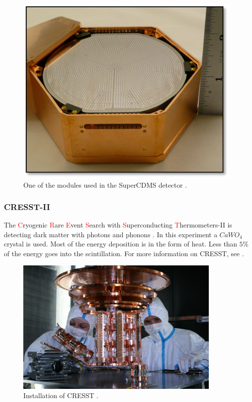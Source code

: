 \documentclass{article}
\begin{document}
\begin{figure}
    \centering
    \includegraphics[width=.9\textwidth]{SuperCDMS.png}
    \caption{One of the modules used in the SuperCDMS detector \cite{SuperCDMSphoto}.}
    \label{fig:SuperCDMS}
\end{figure}

\subsubsection{CRESST-II}
\label{sec:CRESST} The \textcolor{red}{C}ryogenic \textcolor{red}{R}are \textcolor{red}{E}vent \textcolor{red}{S}earch with \textcolor{red}{S}uperconducting \textcolor{red}{T}hermometers-II is detecting dark matter with photons and phonons \cite{Angloher:2015ewa}. In this experiment a $CaWO_4$ crystal is used. Most of the energy deposition is in the form of heat. Less than $5\%$ of the energy goes into the scintillation. For more information on CRESST, see \cite{Bravin:1999fc,Angloher:2014myn,Petricca:2017zdp}.

\begin{figure}
    \centering
    \includegraphics[width=0.9\textwidth]{CRESST.jpg}
    \caption{Installation of CRESST \cite{CRESSTphoto}.}
    \label{fig:CRESST}
\end{figure}
\end{document}
